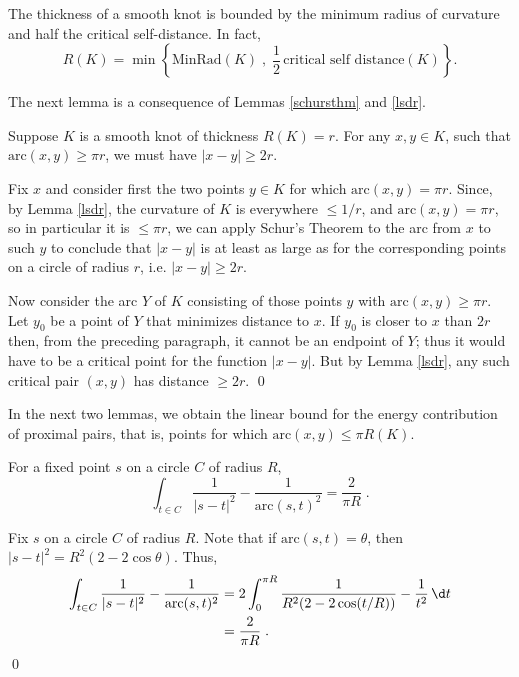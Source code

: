 \documentclass{elsart}
\begin{document}
\begin{lem}  The thickness of a smooth knot is bounded by
the minimum radius of curvature and  half the critical
self-distance.  In fact,
$$R(K)= \min \left\{ {\mathrm{MinRad}}(K)\;,\; \frac12\, 
\text{critical self distance}(K)\right\}.$$
\label{lsdr}
\end{lem}

The next lemma is a consequence of Lemmas
\ref{schursthm} and \ref{lsdr}.
 
\begin{lem} Suppose $K$ is a smooth knot of thickness
$R(K)=r$.  For any $x,y \in K$, such that
$\mathrm{arc}(x,y) \geq \pi r$, we must have $|x-y| \geq
2 r$.
\label{distancebound}
\end{lem}

\begin{pf} Fix $x$ and consider first the two points $y
\in K$ for which $\mathrm{arc}(x,y) = \pi r$. Since, by
Lemma
\ref{lsdr}, the curvature of $K$ is everywhere 
$\leq 1/r$, and
$\mathrm{arc}(x,y) = \pi r$, so in particular it is $\leq
\pi r$, we can apply Schur's Theorem to the arc from $x$
to such
$y$ to conclude that $|x-y|$ is at least as large as for
the corresponding points on a circle of radius $r$,
i.e.{} $|x-y| \geq 2 r$. 

Now consider the arc $Y$ of $K$ consisting of those
points  $y$ with
$\mathrm{arc}(x,y) \geq \pi r$. Let $y_0$ be a point of
$Y$ that minimizes distance to $x$.  If $y_0$ is closer to
$x$ than $2 r$ then, from the preceding paragraph, it
cannot be an endpoint of $Y$; thus it would have to  be a
critical point for the function
$|x-y|$.  But by Lemma \ref{lsdr}, any such  critical
pair $(x,y)$ has distance
$\geq 2 r$.
\qed
\end{pf}

In the next two lemmas, we obtain the linear bound for the
energy contribution of proximal pairs, that is, points for 
which $\mathrm{arc}(x,y)\leq \pi R(K)$.

\begin{lem}  For a fixed point $s$ on a circle $C$ of
radius $R$,
$$\int\nolimits_{t\in C} \frac{1}{|s-t|^2} -
\frac{1}{\mathrm{arc}(s,t)^2} = \frac{2}{\pi R}\;.$$
\label{circle}
\end{lem}

\begin{pf}  Fix $s$ on a circle $C$ of radius $R$.  Note
that if 
$\mathrm{arc}(s,t)=\theta$, then
$|s-t|^2=R^2(2- 2 \cos\theta)$. Thus,
\begin{align*}
\int\nolimits_{t\in C} \frac{1}{|s-t|^2} -
\frac{1}{\mathrm{arc}(s,t)^2} &= 
2\int\nolimits_0^{\pi
R}\frac{1}{R^2(2-2\cos(t/R))}-\frac{1}{t^2}\,\d t \\ 
&= \frac{2}{\pi R}\;.
\end{align*}
\qed
\end{pf}
\end{document}
